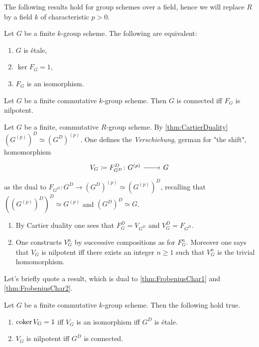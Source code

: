\noindent
The following results hold for group schemes over a field, hence we will replace
$R$ by a field $k$ of characteristic $p > 0$.
\begin{prop}[]\label{thm:FrobeniusChar1}
	Let $G$ be a finite $k$-group scheme.
	The following are equivalent:
\begin{enumerate}
	\item $G$ is étale,
	\item $\ker F_G = 1$,
	\item $F_G$ is an isomorphism.
\end{enumerate}
\end{prop}


\begin{prop}[]\label{thm:FrobeniusChar2}
	Let $G$ be a finite commutative $k$-group scheme.
	Then $G$ is connected iff $F_G$ is nilpotent.
\end{prop}


\begin{defn}[Verschiebung]
	Let $G$ be a finite, commutative $R$-group scheme.
	By \cref{thm:CartierDuality} $(G^{(p)})^D \simeq (G^D)^{(p)}$.
	One defines the {\em Verschiebung}, german for "the shift", homomorphism
	\begin{equation}
	\begin{tikzcd}[row sep = 0ex
		,/tikz/column 1/.append style={anchor=base east}
		,/tikz/column 2/.append style={anchor=base west}]
		V_G \coloneqq F^D_{G^D}\colon G^{(p)} \arrow[r, "", rightarrow] &
		G
	\end{tikzcd}
	\end{equation} 
	as the dual to $F_{G^D}\colon G^D \to (G^D)^{(p)} \simeq (G^{(p)})^D$,
	recalling that $((G^{(p)})^D)^D \simeq G^{(p)}$ and $(G^D)^D \simeq G$.
\end{defn}


\begin{rem}[]\leavevmode\vspace{-.2\baselineskip}
\begin{enumerate}
\item By Cartier duality one sees that $F^D_G = V_{G^D}$ and
	$V^D_G = F_{G^D}$.
\item One constructs $V^n_G$ by successive compositions as for $F^n_G$.
	Moreover one says that $V_G$ is nilpotent iff there exists an integer $n \geq 1$
	such that $V^n_G$ is the trivial homomorphism.
\end{enumerate}
\end{rem}


\noindent
Let's briefly quote a result, which is dual to
\cref{thm:FrobeniusChar1} and \cref{thm:FrobeniusChar2}.
\begin{prop}[]
	Let $G$ be a finite commutative $k$-group scheme. Then the following hold true.
\begin{enumerate}
	\item $\operatorname{coker} V_G = 1$ iff $V_G$ is an isomorphism iff
		$G^D$ is étale.
	\item $V_G$ is nilpotent iff $G^D$ is connected.
\end{enumerate}
\end{prop}


